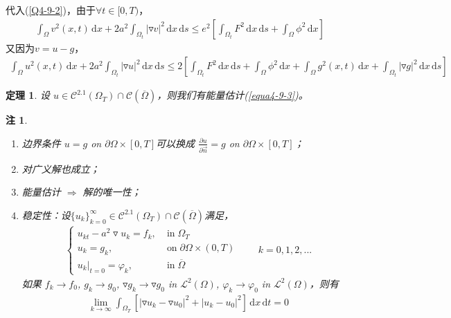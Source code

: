 \documentclass[11pt, a4paper]{article}
\theoremstyle{theorem}
\newtheorem{thm}{定理}[section]
\newtheorem*{note}{注}
\newcommand{\intd}[1]{\,\mathrm{d}{#1}}
\begin{document}
代入(\ref{Q4-9-2})，由于$\forall t \in [0,T)$，
\begin{align}
    \int_\Omega v^2(x,t) \intd x + 2 a^2 \int_{\Omega_t} |\triangledown v|^2 \intd x \intd s \leq e^2 \left[\int_{\Omega_t} F^2 \intd x \intd s + \int_\Omega \phi^2 \intd x \right]
\end{align}
又因为$v = u - g$，
\begin{align}
\label{equa4-9-3}
    \int_\Omega u^2(x,t) \intd x + 2 a^2 \int_{\Omega_t} |\triangledown u|^2 \intd x \intd s \leq 2 \left[\int_{\Omega_t} F^2 \intd x \intd s + \int_\Omega \phi^2 \intd x + \int_\Omega g^2(x,t) \intd x + \int_{\Omega_t} |\triangledown g|^2 \intd x \intd s \right]
\end{align}

\begin{thm}
    设 $u \in \mathcal{C}^{2.1}(\Omega_T) \cap \mathcal{C}(\overline{\Omega})$，则我们有能量估计(\ref{equa4-9-3})。
\end{thm}

\begin{note}
  \begin{enumerate}
    \item 边界条件 $u = g$ on $\partial \Omega \times [0,T]$可以换成 $\frac{\partial u}{\partial \vec{n}} = g$ on $\partial \Omega \times [0,T]$；
    \item 对广义解也成立；
    \item 能量估计 $\Longrightarrow$ 解的唯一性；
    \item 稳定性：设$\{u_k\}_{k=0}^\infty \in \mathcal{C}^{2.1}(\Omega_T) \cap \mathcal{C}(\overline{\Omega})$满足，
    \begin{align*}
        \begin{cases}
            u_{kt} - a^2 \triangledown u_k = f_k, \; &\text{in} \; \Omega_T \\
            u_k = g_k, \; &\text{on} \; \partial \Omega \times (0,T) \\
            u_k \bigg|_{t = 0} = \varphi_k, \; &\text{in} \; \overline{\Omega}
        \end{cases}\quad \quad k = 0,1,2, ...
    \end{align*}
    如果 $f_k \rightarrow f_0$, $g_k \rightarrow g_0$, $\triangledown g_k \rightarrow \triangledown g_0$ in $\mathcal{L}^2(\Omega)$, $\varphi_k \rightarrow \varphi_0$ in $\mathcal{L}^2(\Omega)$，则有
    \begin{align}
        \lim\limits_{k \rightarrow \infty} \int_{\Omega_T} \left[|\triangledown u_k - \triangledown u_0|^2 + |u_k - u_0|^2\right] \intd x \intd t = 0
    \end{align}
  \end{enumerate}
\end{note}
\end{document}
